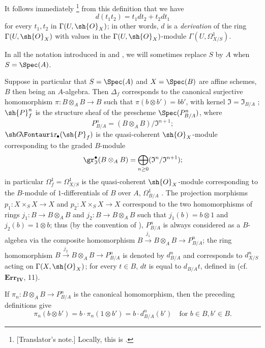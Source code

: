 It follows immediately
\footnote{
  [Translator's note.] Locally, this is .
}
from this definition that we have
\[
  \label{IV.16.3.6.1}
  d(t_1 t_2) = t_1 dt_2 + t_2 dt_1
  \tag{16.3.6.1} 
\]
for every $t_1,t_2$ in $\Gamma(U,\sh{O}_X)$; in other words, $d$ is a \emph{derivation} of the ring $\Gamma(U,\sh{O}_X)$ with values in the $\Gamma(U,\sh{O}_X)$-module $\Gamma(U,\Omega_{X/S}^1)$.

In all the notation introduced in  and , we will sometimes replace $S$ by $A$ when $S=\Spec(A)$.

\begin{env}[16.3.7]
\label{IV.16.3.7}
Suppose in particular that $S = \Spec(A)$ and $X = \Spec(B)$ are affine schemes, $B$ then being an $A$-algebra.
Then $\Delta_f$ corresponds to the canonical surjective homomorphism $\pi: B \otimes_A B \to B$ such that $\pi(b\otimes b') = bb'$, with kernel $\mathfrak{I} = \mathfrak{I}_{B/A}$ ;
$\sh{P}_{f}^n$ is the structure sheaf of the prescheme $\Spec(P_{B/A}^n)$, where
\[
  P_{B/A}^n = (B \otimes_A B)/\mathfrak{I}^{n+1};
\]
$\shGr_\bullet(\sh{P}_f)$ is the quasi-coherent $\sh{O}_X$-module corresponding to the graded $B$-module
\[
  \gr_\mathfrak{I}^\bullet(B \otimes_A B) = \bigoplus_{n \geq 0} (\mathfrak{I}^n/\mathfrak{I}^{n+1});
\]
in particular $\Omega_f^1 = \Omega_{X/S}^1$ is the quasi-coherent $\sh{O}_X$-module corresponding to the $B$-module of $1$-differentials of $B$ over $A$, $\Omega_{B/A}^1$ .
The projection morphisms $p_1:X\times_S X\to X$ and $p_2:X\times_S X\to X$ correspond to the two homomorphisms of rings $j_1:B\to B\otimes_A B$ and $j_2:B\to B\otimes_A B$ such that $j_1(b)=b\otimes 1$ and $j_2(b)=1\otimes b$; thus (by the convention of ), $P_{B/A}^n$ is always considered as a $B$-algebra via the composite homomorphism $B\xrightarrow{j_1}B\otimes_A B\to P_{B/A}^n$;
the ring homomorphism $B \xrightarrow{j_2} B \otimes_A B \to P_{B/A}^n$ is denoted by $d_{B/A}^n$ and corresponds to $d_{X/S}^n$ acting on $\Gamma(X, \sh{O}_X)$;
for every $t\in B$, $dt$ is equal to $d_{B/A}t$, defined in  (cf. $\mathbf{Err_{IV}}$, 11).

If $\pi_n:B\otimes_A B\to P_{B/A}^n$ is the canonical homomorphism, then the preceding definitions give
\[
  \label{IV.16.3.7.1}
  \pi_n(b\otimes b') = b \cdot \pi_n(1\otimes b') = b \cdot d_{B/A}^n(b') \quad \text{for } b \in B, b' \in B.
  \tag{16.3.7.1}
\]
\end{env}

